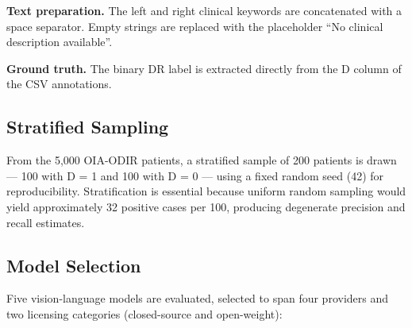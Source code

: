 \documentclass[11pt,a4paper]{article}
\begin{document}
\textbf{Text preparation.} The left and right clinical keywords are concatenated with a space separator. Empty strings are replaced with the placeholder ``No clinical description available''.

\textbf{Ground truth.} The binary DR label is extracted directly from the D column of the CSV annotations.

\subsection{Stratified Sampling}

From the 5,000 OIA-ODIR patients, a stratified sample of 200 patients is drawn --- 100 with D = 1 and 100 with D = 0 --- using a fixed random seed (42) for reproducibility. Stratification is essential because uniform random sampling would yield approximately 32 positive cases per 100, producing degenerate precision and recall estimates.

\subsection{Model Selection}

Five vision-language models are evaluated, selected to span four providers and two licensing categories (closed-source and open-weight):
\end{document}
